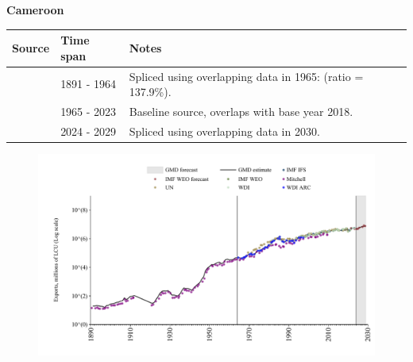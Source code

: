 \documentclass[12pt,a4paper,landscape]{article}
\begin{document}
\begin{adjustbox}{max totalsize={\paperwidth}{\paperheight},center}
\begin{minipage}[t][\textheight][t]{\textwidth}
\vspace*{0.5cm}
{}
\begin{center}
{\Large\bfseries Cameroon}
\end{center}
\vspace{0.5cm}
\begin{table}[H]
\centering
\small
\begin{tabular}{|l|l|l|}
\hline
\textbf{Source} & \textbf{Time span} & \textbf{Notes} \\
\hline
\rowcolor{white}\cite{Mitchell}& 1891 - 1964 &Spliced using overlapping data in 1965: (ratio = 137.9\%).\\
\rowcolor{lightgray}\cite{WDI}& 1965 - 2023 &Baseline source, overlaps with base year 2018.\\
\rowcolor{white}\cite{IMF_WEO_forecast}& 2024 - 2029 &Spliced using overlapping data in 2030.\\
\hline
\end{tabular}
\end{table}
\begin{figure}[H]
\centering
\includegraphics[width=\textwidth,height=0.6\textheight,keepaspectratio]{graphs/CMR_exports.pdf}
\end{figure}
\end{minipage}
\end{adjustbox}
\end{document}
